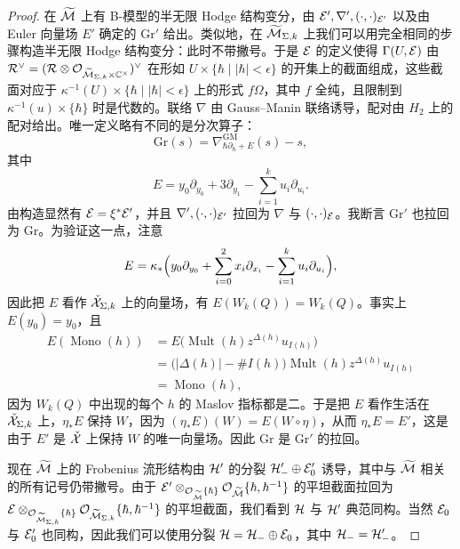 \begin{proof}
在 $\widetilde{\mathcal{M}}$ 上有 B-模型的半无限 Hodge 结构变分，由 $\mathcal{E}',\nabla',(\cdot,\cdot)_{\mathcal{E}'}$ 以及由 Euler 向量场 $E'$ 确定的 $\mathrm{Gr}'$ 给出。类似地，在 $\widetilde{\mathcal{M}}_{\Sigma,k}$ 上我们可以用完全相同的步骤构造半无限 Hodge 结构变分：此时不带撇号。于是 $\mathcal{E}$ 的定义使得 $\Gamma(U,\mathcal{E})$ 由 $\mathcal{R}^{\vee}=(\mathcal{R}\otimes\mathcal{O}_{\widetilde{\mathcal{M}}_{\Sigma,k}\times\mathbb{C}^{\times}})^{\vee}$ 在形如 $U\times\{\hbar\mid |\hbar|<\epsilon\}$ 的开集上的截面组成，这些截面对应于 $\kappa^{-1}(U)\times\{\hbar\mid |\hbar|<\epsilon\}$ 上的形式 $f\Omega$，其中 $f$ 全纯，且限制到 $\kappa^{-1}(u)\times\{\hbar\}$ 时是代数的。联络 $\nabla$ 由 Gauss--Manin 联络诱导，配对由 $H_2$ 上的配对给出。唯一定义略有不同的是分次算子：
\[
  \mathrm{Gr}(s)=\nabla^{\mathrm{GM}}_{\hbar\partial_\hbar+E}(s)-s,
\]
其中
\[
  E=y_0\partial_{y_0}+3\partial_{y_1}-\sum_{i=1}^{k}u_i\partial_{u_i}.
\]
由构造显然有 $\mathcal{E}=\xi^*\mathcal{E}'$，并且 $\nabla',(\cdot,\cdot)_{\mathcal{E}'}$ 拉回为 $\nabla$ 与 $(\cdot,\cdot)_{\mathcal{E}}$。我断言 $\mathrm{Gr}'$ 也拉回为 $\mathrm{Gr}$。为验证这一点，注意
\[
  E=\kappa_*\Bigl(y_0\partial_{y_0}+\sum_{i=0}^{2}x_i\partial_{x_i}-\sum_{i=1}^{k}u_i\partial_{u_i}\Bigr),
\]
因此把 $E$ 看作 $\check{\mathcal{X}}_{\Sigma,k}$ 上的向量场，有 $E(W_k(Q))=W_k(Q)$。事实上 $E(y_0)=y_0$，且
\[
  \begin{aligned}
    E(\operatorname{Mono}(h))
    &=E\bigl(\operatorname{Mult}(h)z^{\Delta(h)}u_{I(h)}\bigr)\\
    &=\bigl(|\Delta(h)|-\#I(h)\bigr)\operatorname{Mult}(h)z^{\Delta(h)}u_{I(h)}\\
    &=\operatorname{Mono}(h),
  \end{aligned}
\]
因为 $W_k(Q)$ 中出现的每个 $h$ 的 Maslov 指标都是二。于是把 $E$ 看作生活在 $\check{\mathcal{X}}_{\Sigma,k}$ 上，$\eta_*E$ 保持 $W$，因为 $(\eta_*E)(W)=E(W\circ\eta)$，从而 $\eta_*E=E'$，这是由于 $E'$ 是 $\check{\mathcal{X}}$ 上保持 $W$ 的唯一向量场。因此 $\mathrm{Gr}$ 是 $\mathrm{Gr}'$ 的拉回。


现在 $\widetilde{\mathcal{M}}$ 上的 Frobenius 流形结构由 $\mathcal{H}'$ 的分裂 $\mathcal{H}'_- \oplus\mathcal{E}'_0$ 诱导，其中与 $\widetilde{\mathcal{M}}$ 相关的所有记号仍带撇号。由于 $\mathcal{E}'\otimes_{\mathcal{O}_{\widetilde{\mathcal{M}}}\{\hbar\}}\mathcal{O}_{\widetilde{\mathcal{M}}}\{\hbar,\hbar^{-1}\}$ 的平坦截面拉回为 $\mathcal{E}\otimes_{\mathcal{O}_{\widetilde{\mathcal{M}}_{\Sigma,k}}\{\hbar\}}\mathcal{O}_{\widetilde{\mathcal{M}}_{\Sigma,k}}\{\hbar,\hbar^{-1}\}$ 的平坦截面，我们看到 $\mathcal{H}$ 与 $\mathcal{H}'$ 典范同构。当然 $\mathcal{E}_0$ 与 $\mathcal{E}'_0$ 也同构，因此我们可以使用分裂 $\mathcal{H}=\mathcal{H}_-\oplus\mathcal{E}_0$，其中 $\mathcal{H}_-=\mathcal{H}'_-$。


\end{proof}
